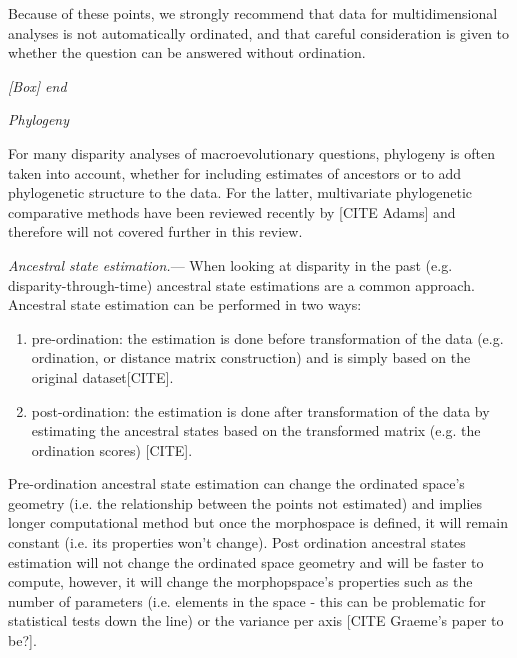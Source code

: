 \documentclass[12pt,letterpaper]{article}
\renewcommand{\subsection}[1]{%
\bigskip
\begin{center}
\begin{large}
\normalfont\itshape #1
\end{large}
\end{center}}
\renewcommand{\subsubsection}[1]{%
\vspace{2ex}
\noindent
\textit{#1.}---}
\begin{document}
Because of these points, we strongly recommend that data for multidimensional analyses is not automatically ordinated, and that careful consideration is given to whether the question can be answered without ordination.
\subsection{[Box] end}

\subsection{Phylogeny}
For many disparity analyses of macroevolutionary questions, phylogeny is often taken into account, whether for including estimates of ancestors or to add phylogenetic structure to the data.
For the latter, multivariate phylogenetic comparative methods have been reviewed recently by [CITE Adams] %
and therefore will not covered further in this review.

\subsubsection{Ancestral state estimation}
When looking at disparity in the past (e.g. disparity-through-time) ancestral state estimations are a common approach.
Ancestral state estimation can be performed in two ways:
\begin{enumerate}
\item pre-ordination: the estimation is done before transformation of the data (e.g. ordination, or distance matrix construction) and is simply based on the original dataset[CITE].
\item post-ordination: the estimation is done after transformation of the data by estimating the ancestral states based on the transformed matrix (e.g. the ordination scores) [CITE].
\end{enumerate}
Pre-ordination ancestral state estimation can change the ordinated space's geometry (i.e. the relationship between the points not estimated) and implies longer computational method but once the morphospace is defined, it will remain constant (i.e. its properties won't change).
Post ordination ancestral states estimation will not change the ordinated space geometry and will be faster to compute, however, it will change the morphopspace's properties such as the number of parameters (i.e. elements in the space - this can be problematic for statistical tests down the line) or the variance per axis [CITE Graeme's paper to be?].
\end{document}
